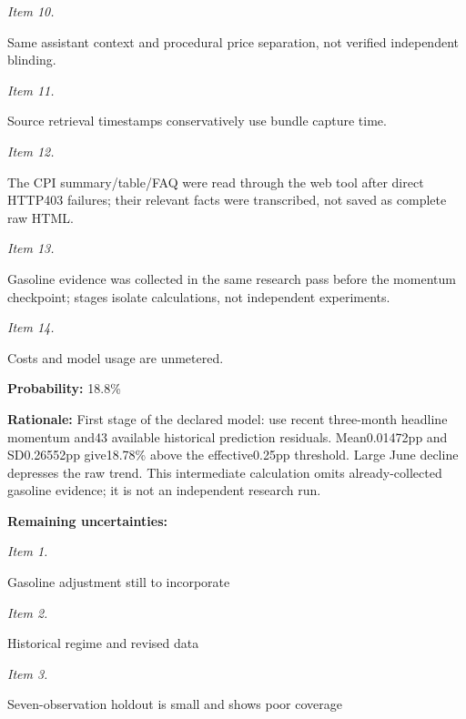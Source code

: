 \documentclass[11pt]{article}
\begin{document}
\par\noindent\textit{Item 10.}\par Same assistant context and procedural price separation, not verified independent blinding.

\par\noindent\textit{Item 11.}\par Source retrieval timestamps conservatively use bundle capture time.

\par\noindent\textit{Item 12.}\par The CPI summary/table/FAQ were read through the web tool after direct HTTP403 failures; their relevant facts were transcribed, not saved as complete raw HTML.

\par\noindent\textit{Item 13.}\par Gasoline evidence was collected in the same research pass before the momentum checkpoint; stages isolate calculations, not independent experiments.

\par\noindent\textit{Item 14.}\par Costs and model usage are unmetered.

\par\noindent\textbf{Probability:} 18.8\%

\par\noindent\textbf{Rationale:} First stage of the declared model: use recent three-month headline momentum and43 available historical prediction residuals. Mean0.01472pp and SD0.26552pp give18.78\% above the effective0.25pp threshold. Large June decline depresses the raw trend. This intermediate calculation omits already-collected gasoline evidence; it is not an independent research run.

\par\noindent\textbf{Remaining uncertainties:} \par \par\noindent\textit{Item 1.}\par Gasoline adjustment still to incorporate

\par\noindent\textit{Item 2.}\par Historical regime and revised data

\par\noindent\textit{Item 3.}\par Seven-observation holdout is small and shows poor coverage
\end{document}
